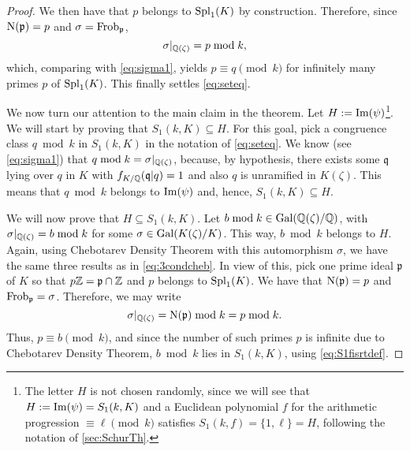 \documentclass[../main.tex]{subfiles}
\begin{document}
\begin{proof}
We then have that $p$ belongs to $\operatorname{Spl}_1(K)$ by construction. Therefore, since $\operatorname{N}(\mathfrak{p})=p$ and $\sigma=\operatorname{Frob}_\mathfrak{p}$,
\begin{equation*}
	\sigma|_{\mathbb{Q}(\zeta)}=p \bmod{k},
\end{equation*}
which, comparing with \cref{eq:sigma1}, yields $p\equiv q\pmod{k}$ for infinitely many primes $p$ of $\operatorname{Spl}_1(K)$. This finally settles \cref{eq:seteq}. 

We now turn our attention to the main claim in the theorem. Let $H:=\operatorname{Im}(\psi)$\footnote{The letter $H$ is not chosen randomly, since we will see that $H:=\operatorname{Im}(\psi)=S_1(k,K)$ and a Euclidean polynomial $f$ for the arithmetic progression $\equiv\ell \pmod{k}$ satisfies $S_1(k,f)=\{1, \ell\}=H$, following the notation of \cref{sec:SchurTh}.}. We will start by proving that $S_1(k,K)\subseteq H$. For this goal, pick a congruence class $q \bmod{k}$ in $S_1(k,K)$ in the notation of \cref{eq:seteq}. We know (see \cref{eq:sigma1}) that $q\bmod{k}=\sigma|_{\mathbb{Q}(\zeta)}$, because, by hypothesis, there exists some $\mathfrak{q}$ lying over $q$ in $K$ with $f_{K/\mathbb{Q}}(\mathfrak{q}|q)=1$ and also $q$ is unramified in $K(\zeta)$. This means that $q \bmod{k}$ belongs to $\operatorname{Im}(\psi)$ and, hence, $S_1(k,K)\subseteq H$.

We will now prove that $H\subseteq S_1(k,K)$. Let $b \bmod{k}\in \operatorname{Gal}(\mathbb{Q}(\zeta)/\mathbb{Q})$, with $\sigma|_{\mathbb{Q}(\zeta)}=b\bmod{k}$ for some $\sigma\in\operatorname{Gal}(K(\zeta)/K)$. This way, $b \bmod{k}$ belongs to $H$. Again, using Chebotarev Density Theorem with this automorphism $\sigma$, we have the same three results as in \cref{eq:3condcheb}. In view of this, pick one prime ideal $\mathfrak{p}$ of $K$ so that $p\mathbb{Z}=\mathfrak{p}\cap\mathbb{Z}$ and $p$ belongs to $\operatorname{Spl}_1(K)$. We have that $\operatorname{N}(\mathfrak{p})=p$ and $\operatorname{Frob}_\mathfrak{p}=\sigma$. Therefore, we may write 
\begin{equation*}
		\sigma|_{\mathbb{Q}(\zeta)}=\operatorname{N}(\mathfrak{p}) \bmod{k}=p\bmod{k}.
\end{equation*}
Thus, $p\equiv b \pmod{k}$, and since the number of such primes $p$ is infinite due to Chebotarev Density Theorem, $b \bmod{k}$ lies in $S_1(k,K)$, using \cref{eq:S1fisrtdef}.
\end{proof}
\end{document}
